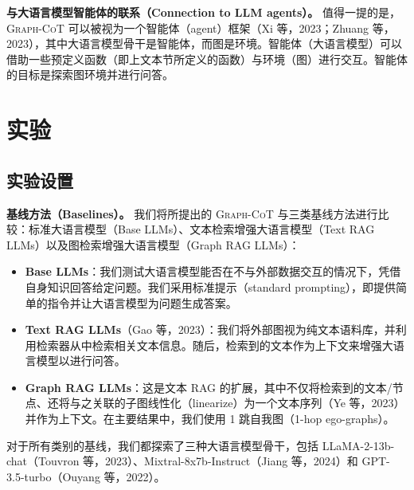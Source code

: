 \documentclass[11pt,UTF8,fontset=fandol]{ctexart}
\begin{document}
\textbf{与大语言模型智能体的联系（Connection to LLM agents）。} 值得一提的是，\textsc{Graph-CoT} 可以被视为一个智能体（agent）框架（Xi 等，2023；Zhuang 等，2023），其中大语言模型骨干是智能体，而图是环境。智能体（大语言模型）可以借助一些预定义函数（即上文本节所定义的函数）与环境（图）进行交互。智能体的目标是探索图环境并进行问答。

\section{实验}

\subsection{实验设置}

\textbf{基线方法（Baselines）。} 我们将所提出的 \textsc{Graph-CoT} 与三类基线方法进行比较：标准大语言模型（Base LLMs）、文本检索增强大语言模型（Text RAG LLMs）以及图检索增强大语言模型（Graph RAG LLMs）：

\begin{itemize}[leftmargin=1.4em]
\item \textbf{Base LLMs}：我们测试大语言模型能否在不与外部数据交互的情况下，凭借自身知识回答给定问题。我们采用标准提示（standard prompting），即提供简单的指令并让大语言模型为问题生成答案。
\item \textbf{Text RAG LLMs}（Gao 等，2023）：我们将外部图视为纯文本语料库，并利用检索器从中检索相关文本信息。随后，检索到的文本作为上下文来增强大语言模型以进行问答。
\item \textbf{Graph RAG LLMs}：这是文本 RAG 的扩展，其中不仅将检索到的文本/节点、还将与之关联的子图线性化（linearize）为一个文本序列（Ye 等，2023）并作为上下文。在主要结果中，我们使用 1 跳自我图（1-hop ego-graphs）。
\end{itemize}

对于所有类别的基线，我们都探索了三种大语言模型骨干，包括 LLaMA-2-13b-chat（Touvron 等，2023）、Mixtral-8x7b-Instruct（Jiang 等，2024）和 GPT-3.5-turbo（Ouyang 等，2022）。
\end{document}
